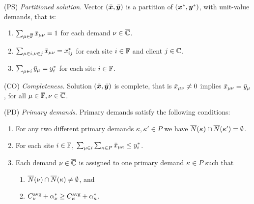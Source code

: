 \documentclass[oneside,final]{ucr}
\begin{document}
\begin{description}
	
      \renewcommand{\theenumii}{(\alph{enumii})}
      \renewcommand{\labelenumii}{\theenumii}

\item{(PS)} \emph{Partitioned solution}.
Vector $(\bar{\boldsymbol{x}},\bar{\boldsymbol{y}})$ is a partition of $(\boldsymbol{x}^\ast,\boldsymbol{y}^\ast)$, with unit-value
  demands, that is:

	\begin{enumerate}
	\item \label{PS:one} 
          $\sum_{\mu\in\overline{\mathbb{F}}} {\bar x}_{\mu\nu} = 1$ for each demand $\nu\in\overline{\mathbb{C}}$. 
	\item \label{PS:xij} $\sum_{\mu\in i, \nu\in j} {\bar x}_{\mu\nu}
          = x^\ast_{ij}$ for each site $i\in\mathbb{F}$ and client $j\in\mathbb{C}$.
	\item \label{PS:yi}
          $\sum_{\mu\in i} {\bar y}_{\mu} = y^\ast_i$ for each site $i\in\mathbb{F}$.
	\end{enumerate}
		
\item{(CO)} \emph{Completeness.}
	Solution   $(\bar{\boldsymbol{x}},\bar{\boldsymbol{y}})$ is complete, that is ${\bar x}_{\mu\nu}\neq 0$ implies
				${\bar x}_{\mu\nu} = {\bar y}_{\mu}$, for all $\mu\in\overline{\mathbb{F}}, \nu\in\overline{\mathbb{C}}$.

\item{(PD)} \emph{Primary demands.}
	Primary demands satisfy the following conditions:

	\begin{enumerate}
		
	\item\label{PD:disjoint}  For any two different primary demands $\kappa,\kappa'\in P$ we have
				${\overline{N}}(\kappa)\cap {\overline{N}}(\kappa') = \emptyset$.

	\item \label{PD:yi} For each site $i\in\mathbb{F}$, 
		$ \sum_{\mu\in i}\sum_{\kappa\in P}{\bar x}_{\mu\kappa} \leq y_i^\ast$.
		
	\item \label{PD:assign} Each demand $\nu\in\overline{\mathbb{C}}$ is assigned
        to one primary demand $\kappa\in P$ such that

  			\begin{enumerate}
	
				\item \label{PD:assign:overlap} ${\overline{N}}(\nu) \cap {\overline{N}}(\kappa) \neq \emptyset$, and
				\item \label{PD:assign:cost} $C^{{\mbox{\scriptsize\rm avg}}}_{\nu}+\alpha_{\nu}^\ast \geq
        			C^{{\mbox{\scriptsize\rm avg}}}_{\kappa}+\alpha_{\kappa}^\ast$.


\end{enumerate}
\end{enumerate}
\end{description}
\end{document}
